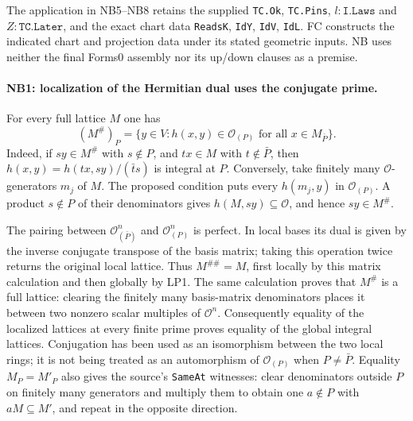 The application in NB5--NB8 retains the supplied
\texttt{TC.Ok}, \texttt{TC.Pins}, $l:\texttt{I.Laws}$ and
$Z:\texttt{TC.Later}$, and the exact chart data
\texttt{ReadsK}, \texttt{IdY}, \texttt{IdV}, \texttt{IdL}.
FC constructs the indicated chart and projection data under its stated
geometric inputs. NB uses neither the final Forms0 assembly nor its
up/down clauses as a premise.

\paragraph{NB1: localization of the Hermitian dual uses the conjugate prime.}
For every full lattice $M$ one has
\[
 (M^\#)_P=\{y\in V:h(x,y)\in\mathcal O_{(P)}
                         \text{ for all }x\in M_{\bar P}\}.
 \tag{NB.1}
\]
Indeed, if $sy\in M^\#$ with $s\notin P$, and $tx\in M$ with
$t\notin\bar P$, then
$h(x,y)=h(tx,sy)/(\bar t s)$ is integral at $P$.
Conversely, take finitely many $\mathcal O$-generators $m_j$ of $M$.
The proposed condition puts every $h(m_j,y)$ in $\mathcal O_{(P)}$.
A product $s\notin P$ of their denominators gives
$h(M,sy)\subseteq\mathcal O$, and hence $sy\in M^\#$.

The pairing between $\mathcal O_{(\bar P)}^n$ and
$\mathcal O_{(P)}^n$ is perfect. In local bases its dual is given by
the inverse conjugate transpose of the basis matrix; taking this
operation twice returns the original local lattice. Thus
$M^{\#\#}=M$, first locally by this matrix calculation and then globally
by LP1. The same calculation proves that $M^\#$ is a full lattice:
clearing the finitely many basis-matrix denominators places it between
two nonzero scalar multiples of $\mathcal O^n$.
Consequently equality of the localized lattices at every finite prime
proves equality of the global integral lattices. Conjugation has been
used as an isomorphism between the two local rings; it is not being
treated as an automorphism of $\mathcal O_{(P)}$ when $P\ne\bar P$.
Equality $M_P=M'_P$ also gives the source's \texttt{SameAt} witnesses:
clear denominators outside $P$ on finitely many generators and multiply
them to obtain one $a\notin P$ with $aM\subseteq M'$, and repeat in
the opposite direction.

